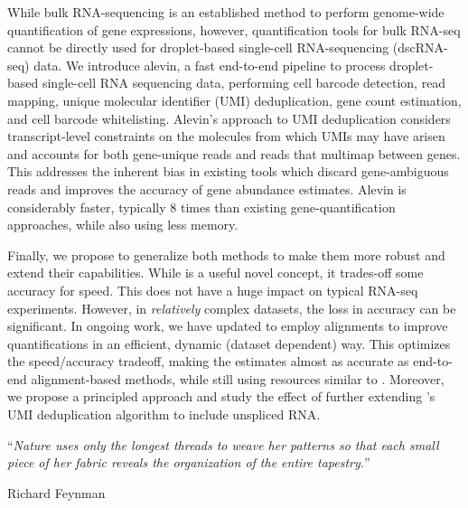 \documentclass[
12pt, %
oneside, %
english, %
singlespacing, %
liststotoc, %
parskip, %
headsepline, %
]{main} %
\begin{document}
While bulk RNA-sequencing is an established method to perform genome-wide quantification of gene 
expressions, however, quantification tools for bulk RNA-seq cannot be directly used for 
droplet-based single-cell RNA-sequencing (dscRNA-seq) data. We introduce alevin, a fast 
end-to-end pipeline to process droplet-based single-cell RNA sequencing data, performing 
cell barcode detection, read mapping, unique molecular identifier (UMI) deduplication, 
gene count estimation, and cell barcode whitelisting. Alevin’s approach to UMI deduplication 
considers transcript-level constraints on the molecules from which UMIs may have arisen and 
accounts for both gene-unique reads and reads that multimap between genes. This addresses 
the inherent bias in existing tools which discard gene-ambiguous reads and improves the 
accuracy of gene abundance estimates. Alevin is considerably faster, typically 8 times  
than existing gene-quantification approaches, while also using less memory.

Finally, we propose to generalize both methods to make them more robust and extend their capabilities. 
While \qm is a useful novel concept, it trades-off some accuracy for speed. This does not have a huge
impact on typical RNA-seq experiments. However, in \textit{relatively} complex datasets, the loss in accuracy 
can be significant. In ongoing work, we have updated \rapmap to employ alignments to improve 
quantifications in an efficient, dynamic (dataset dependent) way. This optimizes the
speed/accuracy tradeoff, making the estimates almost as accurate as end-to-end alignment-based
methods, while still using resources similar to \rapmap. Moreover, we propose a principled approach and 
study the effect of further extending \alevin's UMI deduplication algorithm to include unspliced RNA.
\newpage



\vspace*{0.2\textheight}

\noindent\enquote{\itshape Nature uses only the longest threads to weave her patterns so that each small piece of her fabric reveals the organization of the entire tapestry.}\bigbreak

\hfill Richard Feynman
\end{document}
